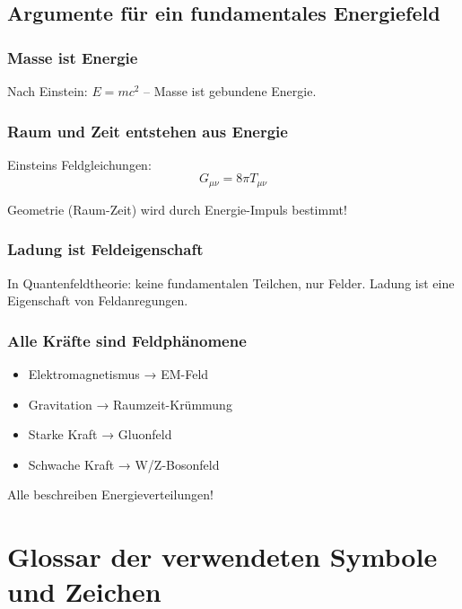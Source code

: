 	\subsection{Argumente für ein fundamentales Energiefeld}
	
	\subsubsection{Masse ist Energie}
	
	Nach Einstein: $E = mc^2$ – Masse ist gebundene Energie.
	
	\subsubsection{Raum und Zeit entstehen aus Energie}
	
	Einsteins Feldgleichungen:
	\begin{equation}
		G_{\mu\nu} = 8\pi T_{\mu\nu}
	\end{equation}
	
	Geometrie (Raum-Zeit) wird durch Energie-Impuls bestimmt!
	
	\subsubsection{Ladung ist Feldeigenschaft}
	
	In Quantenfeldtheorie: keine fundamentalen Teilchen, nur Felder. Ladung ist eine Eigenschaft von Feldanregungen.
	
	\subsubsection{Alle Kräfte sind Feldphänomene}
	
	\begin{itemize}
		\item Elektromagnetismus → EM-Feld
		\item Gravitation → Raumzeit-Krümmung
		\item Starke Kraft → Gluonfeld
		\item Schwache Kraft → W/Z-Bosonfeld
	\end{itemize}
	
	Alle beschreiben Energieverteilungen!
	
	\section{Glossar der verwendeten Symbole und Zeichen}
	
